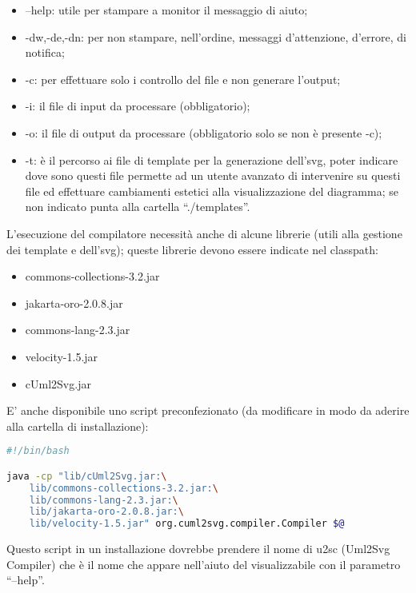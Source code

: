 \begin{itemize}
  \item --help: utile per stampare a monitor il messaggio di aiuto;
  \item -dw,-de,-dn: per non stampare, nell'ordine, messaggi d'attenzione,
  d'errore, di notifica;
  \item -c: per effettuare solo i controllo del file e non generare l'output;
  \item -i: il file di input da processare (obbligatorio);
  \item -o: il file di output da processare (obbligatorio solo se non è presente
  -c);
  \item -t: è il percorso ai file di template per la generazione dell'svg, poter
  indicare dove sono questi file permette ad un utente avanzato di intervenire
  su questi file ed effettuare cambiamenti estetici alla visualizzazione del
  diagramma; se non indicato punta alla cartella ``./templates''.
\end{itemize} 

L'esecuzione del compilatore necessità anche di alcune librerie (utili alla
gestione dei template e dell'svg); queste librerie devono essere indicate nel
classpath:

\begin{itemize}
  \item commons-collections-3.2.jar
  \item jakarta-oro-2.0.8.jar
  \item commons-lang-2.3.jar
  \item velocity-1.5.jar
  \item cUml2Svg.jar
\end{itemize}

E' anche disponibile uno script preconfezionato (da modificare in modo da
aderire alla cartella di installazione):

\begin{lstlisting}[caption={Output dell'help da linea di comando}, style={none},language=sh]
#!/bin/bash

java -cp "lib/cUml2Svg.jar:\
	lib/commons-collections-3.2.jar:\
 	lib/commons-lang-2.3.jar:\
 	lib/jakarta-oro-2.0.8.jar:\
 	lib/velocity-1.5.jar" org.cuml2svg.compiler.Compiler $@
\end{lstlisting}

Questo script in un installazione dovrebbe prendere il nome di u2sc (Uml2Svg
Compiler) che è il nome che appare nell'aiuto del visualizzabile con il
parametro ``--help''.

